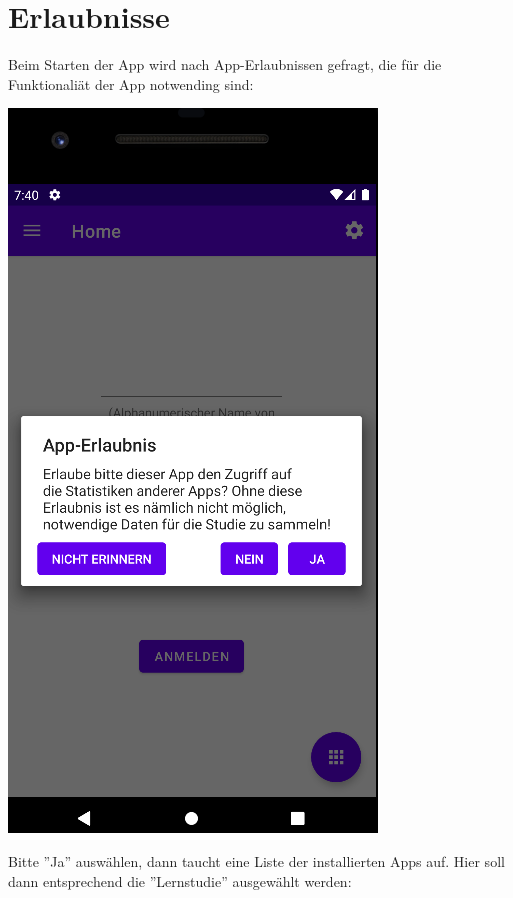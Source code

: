 \documentclass{article}
\begin{document}
\section{Erlaubnisse}
Beim Starten der App wird nach App-Erlaubnissen gefragt, die für die Funktionaliät der App notwending sind: 
\begin{center}
    \includegraphics[scale=0.4]{start_per.png}
\end{center}
Bitte ''Ja'' auswählen, dann taucht eine Liste der installierten Apps auf. Hier soll dann entsprechend die ''Lernstudie'' ausgewählt werden:
\end{document}
